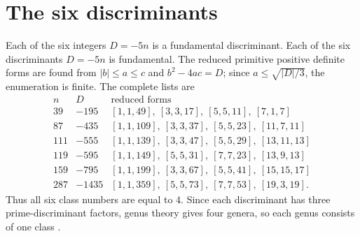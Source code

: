 \documentclass[11pt,a4paper]{article}
\begin{document}
\section{The six discriminants}
Each of the six integers $D=-5n$ is a fundamental discriminant.  Each of the six discriminants $D=-5n$ is fundamental.  The reduced primitive positive definite forms are found from
$|b|\le a\le c$ and $b^2-4ac=D$; since $a\le\sqrt{|D|/3}$, the enumeration is finite.  The complete lists are
\[
\begin{array}{c|c|l}
 n&D&\text{reduced forms}\\ \hline
39&-195&[1,1,49],\ [3,3,17],\ [5,5,11],\ [7,1,7]\\
87&-435&[1,1,109],\ [3,3,37],\ [5,5,23],\ [11,7,11]\\
111&-555&[1,1,139],\ [3,3,47],\ [5,5,29],\ [13,11,13]\\
119&-595&[1,1,149],\ [5,5,31],\ [7,7,23],\ [13,9,13]\\
159&-795&[1,1,199],\ [3,3,67],\ [5,5,41],\ [15,15,17]\\
287&-1435&[1,1,359],\ [5,5,73],\ [7,7,53],\ [19,3,19].
\end{array}
\]
Thus all six class numbers are equal to $4$.  Since each discriminant has three prime-discriminant factors, genus theory gives four genera, so each genus consists of one class \cite{BCZ1997}.
\end{document}
